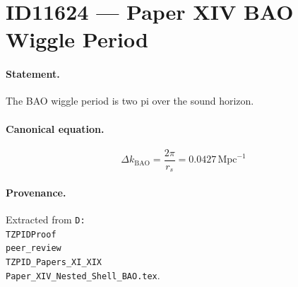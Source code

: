\section*{ID11624 --- Paper XIV BAO Wiggle Period}

\paragraph{Statement.}
The BAO wiggle period is two pi over the sound horizon.

\paragraph{Canonical equation.}
\[
\Delta k_{\mathrm{BAO}}=\frac{2\pi}{r_s}=0.0427\,\mathrm{Mpc}^{-1}
\]

\paragraph{Provenance.}
Extracted from \texttt{D:\\TZPIDProof\\peer\_review\\TZPID\_Papers\_XI\_XIX\\Paper\_XIV\_Nested\_Shell\_BAO.tex}.
